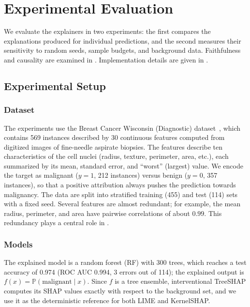 \section{Experimental Evaluation}
\label{sec:results}

We evaluate the explainers in two experiments: the first compares the explanations produced for individual predictions, and the second measures their sensitivity to random seeds, sample budgets, and background data. Faithfulness and causality are examined in . Implementation details are given in .

\subsection{Experimental Setup}
\label{sec:setup}

\subsubsection{Dataset}
The experiments use the Breast Cancer Wisconsin (Diagnostic) dataset~\cite{breast_cancer_dataset}, which contains 569 instances described by 30 continuous features computed from digitized images of fine-needle aspirate biopsies. The features describe ten characteristics of the cell nuclei (radius, texture, perimeter, area, etc.), each summarized by its mean, standard error, and ``worst'' (largest) value. We encode the target as malignant ($y = 1$, 212 instances) versus benign ($y = 0$, 357 instances), so that a positive attribution always pushes the prediction towards malignancy. The data are split into stratified training (455) and test (114) sets with a fixed seed. Several features are almost redundant; for example, the mean radius, perimeter, and area have pairwise correlations of about $0.99$. This redundancy plays a central role in .

\subsubsection{Models}
The explained model is a random forest (RF) with 300 trees, which reaches a test accuracy of 0.974 (ROC AUC 0.994, 3 errors out of 114); the explained output is $f(x) = \mathbb{P}(\text{malignant} \mid x)$. Since $f$ is a tree ensemble, interventional TreeSHAP computes its SHAP values exactly with respect to the background set, and we use it as the deterministic reference for both LIME and KernelSHAP.

